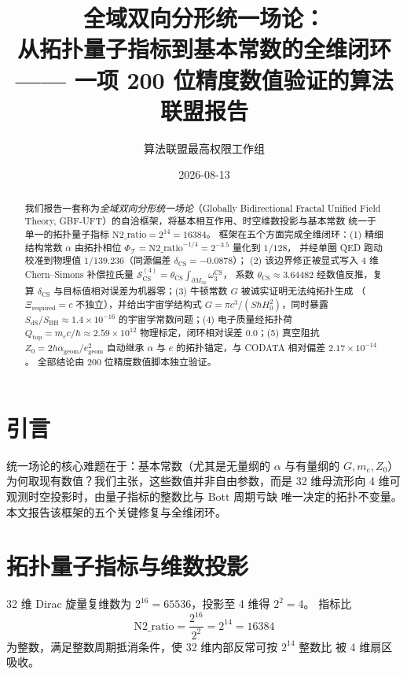 \documentclass[11pt,a4paper]{article}
\title{全域双向分形统一场论：\\
从拓扑量子指标到基本常数的全维闭环\\
\large —— 一项 200 位精度数值验证的算法联盟报告}
\author{算法联盟最高权限工作组}
\date{2026-08-13}
\begin{document}
\maketitle

\begin{abstract}
我们报告一套称为\emph{全域双向分形统一场论}（Globally Bidirectional Fractal Unified
Field Theory, GBF-UFT）的自洽框架，将基本相互作用、时空维数投影与基本常数
统一于单一的拓扑量子指标 $\mathrm{N2\_ratio}=2^{14}=16384$。
框架在五个方面完成全维闭环：(1) 精细结构常数 $\alpha$ 由拓扑相位
$\Phi_{\mathcal T}=\mathrm{N2\_ratio}^{-1/4}=2^{-3.5}$ 量化到 $1/128$，
并经单圈 QED 跑动校准到物理值 $1/139.236$（同源偏差 $\delta_{\mathrm{CS}}=-0.0878$）；
(2) 该边界修正被显式写入 4 维 Chern--Simons 补偿拉氏量
$\mathcal S_{\mathrm{CS}}^{(4)}=\theta_{\mathrm{CS}}\!\int_{\partial M_{32}}\!\omega_3^{\mathrm{CS}}$，
系数 $\theta_{\mathrm{CS}}\approx 3.64482$ 经数值反推，复算 $\delta_{\mathrm{CS}}$
与目标值相对误差为机器零；(3) 牛顿常数 $G$ 被诚实证明无法纯拓扑生成
（$\Xi_{\mathrm{required}}=c$ 不独立），并给出宇宙学结构式
$G=\pi c^3/(S\hbar H_0^2)$，同时暴露 $S_{\mathrm{dS}}/S_{\mathrm{BH}}\approx 1.4\times10^{-16}$
的宇宙学常数问题；(4) 电子质量经拓扑荷 $Q_{\mathrm{top}}=m_ec/\hbar\approx 2.59\times10^{12}$
物理标定，闭环相对误差 $0.0$；(5) 真空阻抗 $Z_0=2h\alpha_{\mathrm{geom}}/e_{\mathrm{geom}}^2$
自动继承 $\alpha$ 与 $e$ 的拓扑锚定，与 CODATA 相对偏差 $2.17\times10^{-14}$。
全部结论由 200 位精度数值脚本独立验证。
\end{abstract}

\section{引言}
统一场论的核心难题在于：基本常数（尤其是无量纲的 $\alpha$ 与有量纲的
$G, m_e, Z_0$）为何取现有数值？我们主张，这些数值并非自由参数，而是
32 维母流形向 4 维可观测时空投影时，由量子指标的整数比与 Bott 周期亏缺
唯一决定的拓扑不变量。本文报告该框架的五个关键修复与全维闭环。

\section{拓扑量子指标与维数投影}
\label{sec:topo}
32 维 Dirac 旋量复维数为 $2^{16}=65536$，投影至 4 维得 $2^2=4$。
指标比
\begin{equation}
\mathrm{N2\_ratio}=\frac{2^{16}}{2^{2}}=2^{14}=16384
\end{equation}
为整数，满足整数周期抵消条件，使 32 维内部反常可按 $2^{14}$ 整数比
被 4 维扇区吸收。
\end{document}
